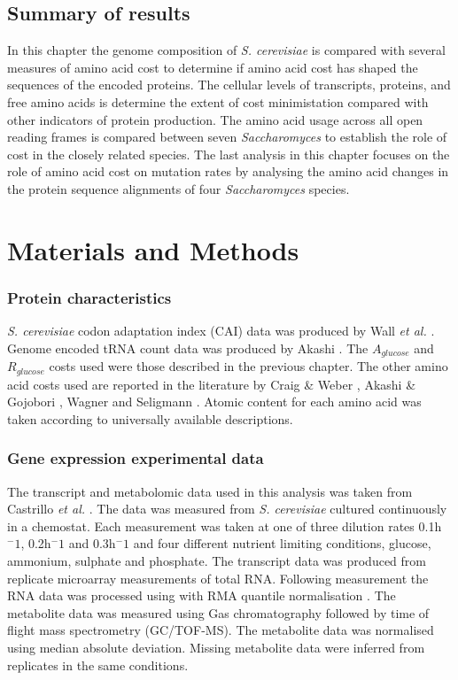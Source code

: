 \subsection{Summary of results}

In this chapter the genome composition of \emph{S. cerevisiae} is compared with several measures of amino acid cost to determine if amino acid cost has shaped the sequences of the encoded proteins. The cellular levels of transcripts, proteins, and free amino acids is determine the extent of cost minimistation compared with other indicators of protein production. The amino acid usage across all open reading frames is compared between seven \emph{Saccharomyces} to establish the role of cost in the closely related species. The last analysis in this chapter focuses on the role of amino acid cost on mutation rates by analysing the amino acid changes in the protein sequence alignments of four \emph{Saccharomyces} species.

\clearpage

\section{Materials and Methods}

\subsubsection{Protein characteristics}

\emph{S. cerevisiae} codon adaptation index (CAI) data was produced by Wall \emph{et al.} \cite{wall2005}. Genome encoded tRNA count data was produced by Akashi \cite{akashi_trna}. The $A_{glucose}$ and $R_{glucose}$ costs used were those described in the previous chapter. The other amino acid costs used are reported in the literature by Craig \& Weber \cite{craig1998}, Akashi \& Gojobori \cite{akashi2002}, Wagner \cite{wagner2005} and Seligmann \cite{seligmann2004}. Atomic content for each amino acid was taken according to universally available descriptions.

\subsubsection{Gene expression experimental data}

The transcript and metabolomic data used in this analysis was taken from Castrillo \emph{et al.} \cite{castrillo2007}. The data was measured from \emph{S. cerevisiae} cultured continuously in a chemostat. Each measurement was taken at one of three dilution rates 0.1h$^-1$, 0.2h$^-1$ and 0.3h$^-1$ and four different nutrient limiting conditions, glucose, ammonium, sulphate and phosphate. The transcript data was produced from replicate microarray measurements of total RNA. Following measurement the RNA data was processed using with RMA quantile normalisation \cite{RMA}. The metabolite data was measured using Gas chromatography followed by time of flight mass spectrometry (GC/TOF-MS). The metabolite data was normalised using median absolute deviation. Missing metabolite data were inferred from replicates in the same conditions.

